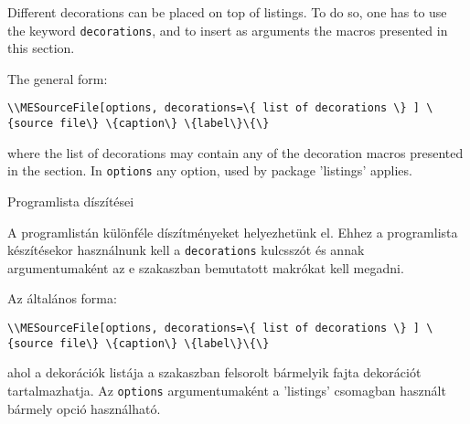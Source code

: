 {
Different decorations can be placed on top of listings.
To do so, one has to use the keyword  \lstinline|decorations|,
and to insert as arguments the macros presented in this section.

The general form:
\par\noindent\lstinline|\\MESourceFile[options,
decorations=\{
list of decorations
\}
] \{source file\} \{caption\} \{label\}\{\}|
\par\noindent where the list of decorations may contain any of the 
decoration macros presented in the section.
In \lstinline|options| any option, used by package 'listings' applies.
}
{Programlista díszítései}
{
A programlistán különféle díszítményeket helyezhetünk el.
Ehhez a programlista készítésekor használnunk kell a \lstinline|decorations| kulcsszót
és annak argumentumaként az e szakaszban bemutatott makrókat kell megadni.

Az általános forma:
\par\noindent\lstinline|\\MESourceFile[options,
decorations=\{
list of decorations
\}
] \{source file\} \{caption\} \{label\}\{\}|
\par\noindent ahol a dekorációk listája a szakaszban felsorolt 
bármelyik fajta dekorációt tartalmazhatja.
Az \lstinline|options| argumentumaként a 'listings' csomagban használt bármely opció használható.
}



